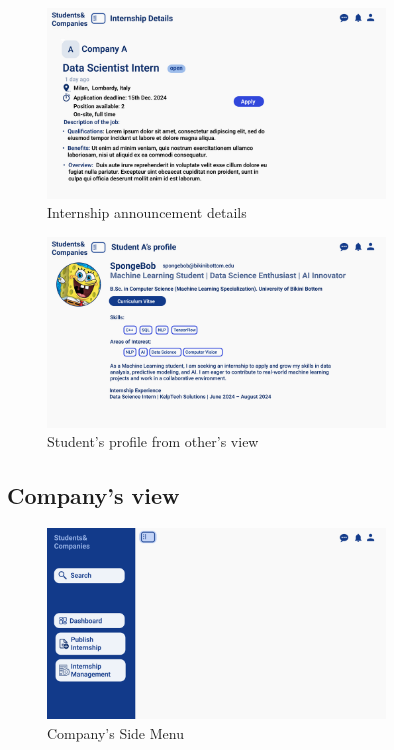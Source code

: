 \begin{figure}[H]
    \centering
    \includegraphics[width=0.8\textwidth]{Images/UI/Internship details-student view.png}
    \caption{Internship announcement details }\label{fig:Internship announcement details}
\end{figure}

\begin{figure}[H]
    \centering
    \includegraphics[width=0.8\textwidth]{Images/UI/Student profile.png}
    \caption{Student's profile from other's view}\label{fig:Student's profile from other's view}
\end{figure}

\subsection{Company's view}

\begin{figure}[H]
    \centering
    \includegraphics[width=0.8\textwidth]{Images/UI/Layout-Company.png}
    \caption{Company's Side Menu}\label{fig:Company_view}
\end{figure}

